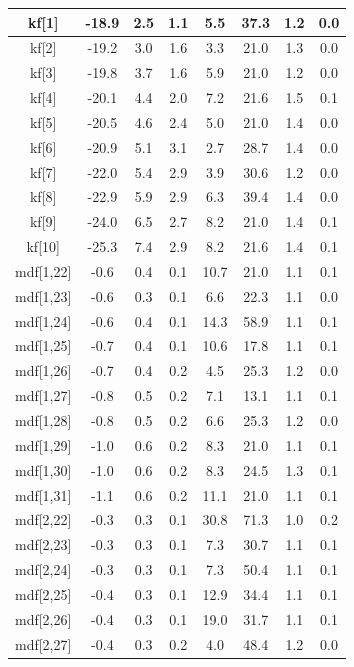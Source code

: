 \begin{longtable}{|c|c|c|c|c|c|c|c|}
\hline
kf[1] & -18.9 & 2.5 & 1.1 & 5.5 & 37.3 & 1.2 & 0.0 \\
\hline
kf[2] & -19.2 & 3.0 & 1.6 & 3.3 & 21.0 & 1.3 & 0.0 \\
\hline
kf[3] & -19.8 & 3.7 & 1.6 & 5.9 & 21.0 & 1.2 & 0.0 \\
\hline
kf[4] & -20.1 & 4.4 & 2.0 & 7.2 & 21.6 & 1.5 & 0.1 \\
\hline
kf[5] & -20.5 & 4.6 & 2.4 & 5.0 & 21.0 & 1.4 & 0.0 \\
\hline
kf[6] & -20.9 & 5.1 & 3.1 & 2.7 & 28.7 & 1.4 & 0.0 \\
\hline
kf[7] & -22.0 & 5.4 & 2.9 & 3.9 & 30.6 & 1.2 & 0.0 \\
\hline
kf[8] & -22.9 & 5.9 & 2.9 & 6.3 & 39.4 & 1.4 & 0.0 \\
\hline
kf[9] & -24.0 & 6.5 & 2.7 & 8.2 & 21.0 & 1.4 & 0.1 \\
\hline
kf[10] & -25.3 & 7.4 & 2.9 & 8.2 & 21.6 & 1.4 & 0.1 \\
\hline
mdf[1,22] & -0.6 & 0.4 & 0.1 & 10.7 & 21.0 & 1.1 & 0.1 \\
\hline
mdf[1,23] & -0.6 & 0.3 & 0.1 & 6.6 & 22.3 & 1.1 & 0.0 \\
\hline
mdf[1,24] & -0.6 & 0.4 & 0.1 & 14.3 & 58.9 & 1.1 & 0.1 \\
\hline
mdf[1,25] & -0.7 & 0.4 & 0.1 & 10.6 & 17.8 & 1.1 & 0.1 \\
\hline
mdf[1,26] & -0.7 & 0.4 & 0.2 & 4.5 & 25.3 & 1.2 & 0.0 \\
\hline
mdf[1,27] & -0.8 & 0.5 & 0.2 & 7.1 & 13.1 & 1.1 & 0.1 \\
\hline
mdf[1,28] & -0.8 & 0.5 & 0.2 & 6.6 & 25.3 & 1.2 & 0.0 \\
\hline
mdf[1,29] & -1.0 & 0.6 & 0.2 & 8.3 & 21.0 & 1.1 & 0.1 \\
\hline
mdf[1,30] & -1.0 & 0.6 & 0.2 & 8.3 & 24.5 & 1.3 & 0.1 \\
\hline
mdf[1,31] & -1.1 & 0.6 & 0.2 & 11.1 & 21.0 & 1.1 & 0.1 \\
\hline
mdf[2,22] & -0.3 & 0.3 & 0.1 & 30.8 & 71.3 & 1.0 & 0.2 \\
\hline
mdf[2,23] & -0.3 & 0.3 & 0.1 & 7.3 & 30.7 & 1.1 & 0.1 \\
\hline
mdf[2,24] & -0.3 & 0.3 & 0.1 & 7.3 & 50.4 & 1.1 & 0.1 \\
\hline
mdf[2,25] & -0.4 & 0.3 & 0.1 & 12.9 & 34.4 & 1.1 & 0.1 \\
\hline
mdf[2,26] & -0.4 & 0.3 & 0.1 & 19.0 & 31.7 & 1.1 & 0.1 \\
\hline
mdf[2,27] & -0.4 & 0.3 & 0.2 & 4.0 & 48.4 & 1.2 & 0.0 \\

\end{longtable}
